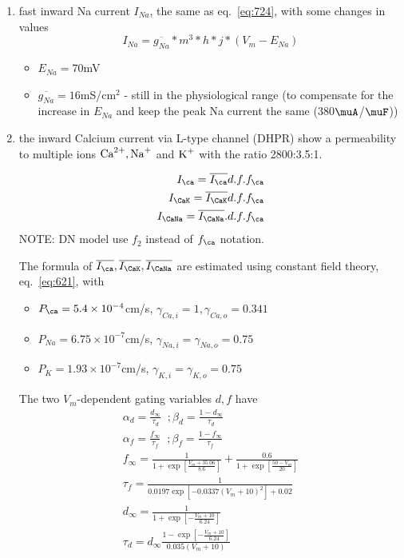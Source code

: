 \begin{enumerate}
\item fast inward Na current $I_{Na}$, the same as eq.~\eqref{eq:724},
  with some changes in values
  \begin{equation}
    \label{eq:940}
    I_{Na}= \overline{g_{Na}} * m^3 * h * j * (V_m - E_{Na})
  \end{equation}
  \begin{itemize}
  \item $E_{Na} = 70$mV 
  \item $\overline{g_{Na}}=16$mS/cm$^2$ - still in the physiological
    range (to compensate for the increase in $E_{Na}$ and keep the
    peak Na current the same (380$\muA$/$\muF$))
  \end{itemize}

\item the inward Calcium current via L-type channel (DHPR) show a
  permeability to multiple ions $\Ca, \ce{Na+}$ and $\ce{K+}$
  with the ratio 2800:3.5:1.

  \begin{equation}
       \label{eq:759}
       \begin{split}
         I_\ca  = \overline{I_\ca } d.f.f_\ca  \\
      I_\CaK = \overline{I_\CaK} d.f.f_\ca  \\
      I_\CaNa = \overline{I_\CaNa}.d.f.f_\ca 
    \end{split}
  \end{equation}
NOTE: DN model use $f_2$ instead of $f_\ca $ notation. 

The formula of $\overline{I_\ca }, \overline{I_\CaK},
\overline{I_\CaNa}$ are estimated using constant field theory,
eq.~\eqref{eq:621}, with
\begin{itemize}
\item $P_\ca  = 5.4\times 10^{-4}$cm/s, $\gamma_{Ca,i}=1,
  \gamma_{Ca,o}=0.341$
\item $P_{Na} = 6.75\times 10^{-7}$cm/s, $\gamma_{Na,i}= \gamma_{Na,o}=0.75$
\item $P_{K} = 1.93\times 10^{-7}$cm/s, $\gamma_{K,i}= \gamma_{K,o}=0.75$
\end{itemize}
The two $V_m$-dependent gating variables $d,f$ have
\begin{equation}
  \label{eq:762}
  \begin{split}
    \alpha_d = \frac{d_\infty}{\tau_d} \; \; ;
    \beta_d = \frac{1-d_\infty}{\tau_d} \\
    \alpha_f =  \frac{f_\infty}{\tau_f} \;\; ;
    \beta_f = \frac{1-f_\infty}{\tau_f} \\
     f_\infty = \frac{1}{1+\exp[\frac{V_m+35.06}{8.6}]} +
     \frac{0.6}{1+\exp[\frac{50-V_m}{20}]} \\
     \tau_f = \frac{1}{0.0197\exp\left[-0.0337 (V_m+10)^2
       \right]+0.02} \\
     d_\infty =\frac{1}{1+\exp[-\frac{V_m+10}{6.24}]} \\
     \tau_d = d_\infty
     \frac{1-\exp[-\frac{V_m+10}{6.24}]}{0.035(V_m+10)} 
  \end{split}
\end{equation}


\end{enumerate}
